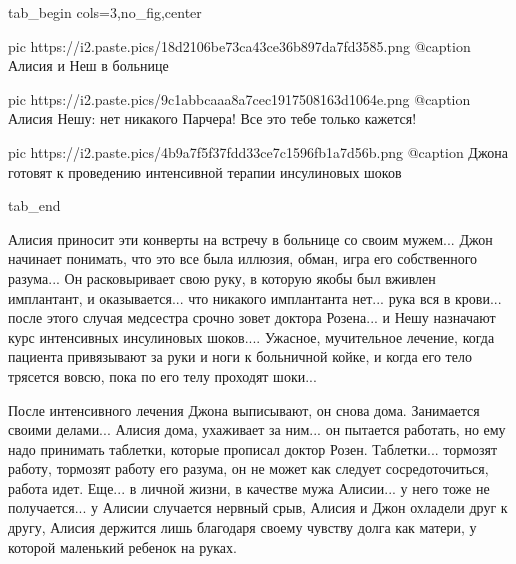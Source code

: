\ifcmt
  tab_begin cols=3,no_fig,center

     pic https://i2.paste.pics/18d2106be73ca43ce36b897da7fd3585.png
		 @caption Алисия и Неш в больнице

		 pic https://i2.paste.pics/9c1abbcaaa8a7cec1917508163d1064e.png
		 @caption Алисия Нешу: нет никакого Парчера! Все это тебе только кажется!

		 pic https://i2.paste.pics/4b9a7f5f37fdd33ce7c1596fb1a7d56b.png
		 @caption Джона готовят к проведению интенсивной терапии инсулиновых шоков

  tab_end
\fi

Алисия приносит эти конверты на встречу в больнице со своим мужем...  Джон
начинает понимать, что это все была иллюзия, обман, игра его собственного
разума...  Он расковыривает свою руку, в которую якобы был вживлен имплантант,
и оказывается... что никакого имплантанта нет... рука вся в крови... после
этого случая медсестра срочно зовет доктора Розена...  и Нешу назначают курс
интенсивных инсулиновых шоков.... Ужасное, мучительное лечение, когда пациента
привязывают за руки и ноги к больничной койке, и когда его тело трясется вовсю,
пока по его телу проходят шоки... 


После интенсивного лечения Джона выписывают, он снова дома. Занимается своими
делами...  Алисия дома, ухаживает за ним... он пытается работать, но ему надо
принимать таблетки, которые прописал доктор Розен.  Таблетки... тормозят
работу, тормозят работу его разума, он не может как следует сосредоточиться,
работа идет.  Еще... в личной жизни, в качестве мужа Алисии... у него тоже не
получается... у Алисии случается нервный срыв, Алисия и Джон охладели друг к
другу, Алисия держится лишь благодаря своему чувству долга как матери, у
которой маленький ребенок на руках. 

